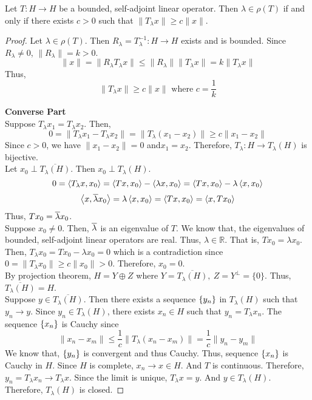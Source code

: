 \begin{theorem}
	Let $T : H \to H$ be a bounded, self-adjoint linear operator.
	Then $\lambda \in \rho(T)$ if and only if there exists $c > 0$ such that $\|T_\lambda x\| \ge c\|x\|$.
\end{theorem}
\begin{proof}
	Let $\lambda \in \rho(T)$.
	Then $R_\lambda = T_\lambda^{-1} : H \to H$ exists and is bounded.
	Since $R_\lambda \ne 0$, $\|R_\lambda\| = k > 0$.
	\[ \|x\| = \| R_\lambda T_\lambda x\| \le \|R_\lambda\| \|T_\lambda x\| = k\|T_\lambda x\| \]
	Thus,
	\begin{equation}
		\|T_\lambda x\| \ge c\|x\| \text{ where } c = \frac{1}{k} 
	\end{equation}

	\textbf{Converse Part}\\
	Suppose $T_\lambda x_1 = T_\lambda x_2$.
	Then,
	\[ 0 = \|T_\lambda x_1 - T_\lambda x_2\| = \| T_\lambda (x_1-x_2) \| \ge c\|x_1-x_2\| \]
	Since $c > 0$, we have $\|x_1 - x_2\| = 0$ and$x_1 = x_2$.
	Therefore, $T_\lambda : H \to T_\lambda(H)$ is bijective.\\

	Let $x_0 \perp \overline{T_\lambda(H)}$.
	Then $x_0 \perp T_\lambda(H)$.
	\[ 0 =  \left\langle T_\lambda x,x_0 \right\rangle = \left\langle Tx,x_0 \right\rangle - \left\langle \lambda x,x_0 \right\rangle = \left\langle Tx,x_0 \right\rangle - \lambda\left\langle x,x_0 \right\rangle \]
	\[ \left\langle x,\overline{\lambda} x_0 \right\rangle = \lambda \left\langle x,x_0 \right\rangle = \left\langle Tx,x_0 \right\rangle = \left\langle x,Tx_0 \right\rangle \]
	Thus, $Tx_0 = \overline{\lambda}x_0$.\\

	Suppose $x_0 \ne 0$.
	Then, $\overline{\lambda}$ is an eigenvalue of $T$.
	We know that, the eigenvalues of bounded, self-adjoint linear operators are real.
	Thus, $\lambda \in \mathbb{R}$.
	That is, $Tx_0 = \lambda x_0$.
	Then, $T_\lambda x_0 = Tx_0 - \lambda x_0 = 0$ which is a contradiction since $0 = \|T_\lambda x_0\| \ge c\|x_0\| > 0$.
	Therefore, $x_0 = 0$.\\

	By projection theorem, $H = Y \oplus Z$ where $Y = \overline{T_\lambda(H)},\ Z = Y^\perp = \{ 0 \}$.
	Thus, $\overline{T_\lambda(H)} = H$.\\

	Suppose $y \in \overline{T_\lambda(H)}$.
	Then there exists a sequence $\left\{y_n\right\}$ in $T_\lambda(H)$ such that $y_n \to y$.
	Since $y_n \in T_\lambda(H)$, there exists $x_n \in H$ such that $y_n = T_\lambda x_n$.
	The sequence $\left\{x_n\right\}$ is Cauchy since
	\[ \|x_n - x_m\| \le \frac{1}{c}\|T_\lambda(x_n-x_m)\| = \frac{1}{c}\|y_n-y_m\| \]
	We know that, $\left\{y_n\right\}$ is convergent and thus Cauchy.
	Thus, sequence $\left\{x_n\right\}$ is Cauchy in $H$.
	Since $H$ is complete, $x_n \to x \in H$.
	And $T$ is continuous.
	Therefore, $y_n = T_\lambda x_n \to T_\lambda x$.
	Since the limit is unique, $T_\lambda x = y$.
	And $y \in T_\lambda(H)$.
	Therefore, $T_\lambda(H)$ is closed.
\end{proof}

